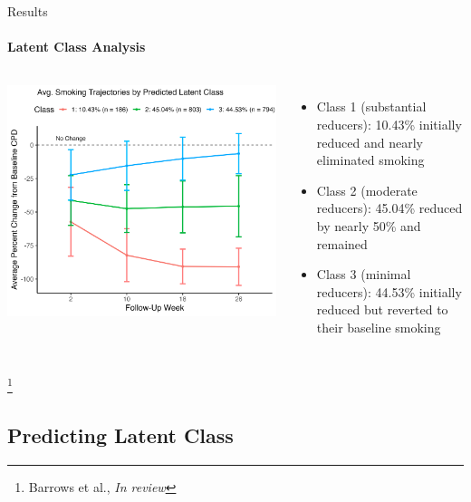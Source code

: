 \documentclass[aspectratio=169]{beamer}
\newcommand\blfootnote[1]{%
	\begingroup
	\renewcommand\thefootnote{}\footnote{#1}%
	\addtocounter{footnote}{-1}%
	\endgroup
}
\newcommand{\reviewcite}{\blfootnote{\tiny Barrows et al., \textit{In review}}}
\begin{document}
\begin{frame}{Results}
	\framesubtitle{Latent Class Analysis}
	\begin{columns}
			\includegraphics[width=\columnwidth]{smoking_traj}
			\begin{itemize}
				\small
				\item \textcolor{class1}{Class 1 (substantial reducers):} 10.43\% initially reduced and nearly eliminated smoking
				\item \textcolor{class2}{Class 2 (moderate reducers):} 45.04\% reduced by nearly 50\% and remained
				\item \textcolor{class3}{Class 3 (minimal reducers):} 44.53\% initially reduced but reverted to their baseline smoking
			\end{itemize}
	\end{columns}

\reviewcite

\end{frame}


\subsection{Predicting Latent Class}
\end{document}
